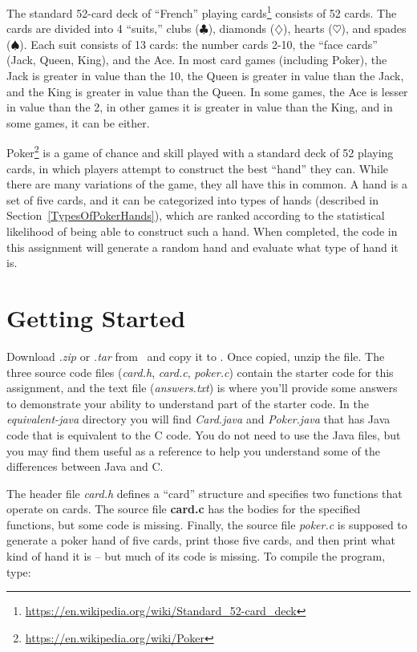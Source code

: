 The standard 52-card deck of ``French'' playing
cards\footnote{\url{https://en.wikipedia.org/wiki/Standard_52-card_deck}}
consists of 52 cards. The cards are divided into 4 ``suits,'' clubs
($\clubsuit$), diamonds ($\diamondsuit$), hearts ($\heartsuit$), and spades
($\spadesuit$). Each suit consists of 13 cards: the number cards 2-10, the
``face cards'' (Jack, Queen, King), and the Ace. In most card games (including
Poker), the Jack is greater in value than the 10, the Queen is greater in value
than the Jack, and the King is greater in value than the Queen. In some games,
the Ace is lesser in value than the 2, in other games it is greater in value
than the King, and in some games, it can be either.

Poker\footnote{\url{https://en.wikipedia.org/wiki/Poker}} is a game of chance
and skill played with a standard deck of 52 playing cards, in which players
attempt to construct the best ``hand'' they can. While there are many
variations of the game, they all have this in common. A hand is a set of five
cards, and it can be categorized into types of hands (described in
Section~\ref{TypesOfPokerHands}), which are ranked according to the statistical
likelihood of being able to construct such a hand. When completed, the code in
this assignment will generate a random hand and evaluate what type of hand it
is.

\section{Getting Started}

Download \textit{\shortlabname.zip} or \textit{\shortlabname.tar} from
\filesource\ and copy it to \runtimeenvironment. Once copied, unzip the file.
The three source code files (\textit{card.h}, \textit{card.c},
\textit{poker.c}) contain the starter code for this assignment, and the text
file (\textit{answers.txt}) is where you'll provide some answers to demonstrate
your ability to understand part of the starter code. In the
\mbox{\textit{equivalent-java}} directory you will find \textit{Card.java} and
\textit{Poker.java} that has Java code that is equivalent to the C code. You do
not need to use the Java files, but you may find them useful as a reference to
help you understand some of the differences between Java and C.

The header file \textit{card.h} defines a ``card'' structure and specifies two
functions that operate on cards. The source file \textbf{card.c} has the bodies
for the specified functions, but some code is missing. Finally, the source file
\textit{poker.c} is supposed to generate a poker hand of five cards, print
those five cards, and then print what kind of hand it is -- but much of its
code is missing. To compile the program, type:

